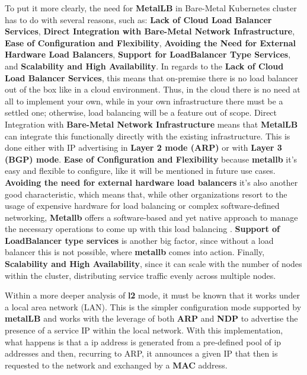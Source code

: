 To put it more clearly, the need for \textbf{MetalLB} in Bare-Metal Kubernetes cluster has to do with several reasons, such as: \textbf{Lack of Cloud Load Balancer Services}, \textbf{Direct Integration with Bare-Metal Network Infrastructure}, \textbf{Ease of Configuration and Flexibility}, \textbf{Avoiding the Need for External Hardware Load Balancers}, \textbf{Support for LoadBalancer Type Services}, and \textbf{Scalability and High Availability}. In regards to the \textbf{Lack of Cloud Load Balancer Services}, this means that on-premise there is no load balancer out of the box like in a cloud environment. Thus, in the cloud there is no need at all to implement your own, while in your own infrastructure there must be a settled one; otherwise, load balancing will be a feature out of scope. Direct Integration with \textbf{Bare-Metal Network Infrastructure} means that \textbf{MetalLB} can integrate this functionally directly with the existing infrastructure. This is done either with IP advertising in \textbf{Layer 2 mode (ARP)} or with \textbf{Layer 3 (BGP) mode}. \textbf{Ease of Configuration and Flexibility} because \textbf{metallb} it's easy and flexible to configure, like it will be mentioned in future use cases. \textbf{Avoiding the need for external hardware load balancers} it's also another good characteristic, which means that, while other organizations resort to the usage of expensive hardware for load balancing or complex software-defined networking, \textbf{Metallb} offers a software-based and yet native approach to manage the necessary operations to come up with this load balancing \cite{hardware-vs-on-premise}. \textbf{Support of LoadBalancer type services} is another big factor, since without a load balancer this is not possible, where \textbf{metallb} comes into action. Finally, \textbf{Scalability and High Availability}, since it can scale with the number of nodes within the cluster, distributing service traffic evenly across multiple nodes.

Within a more deeper analysis of \textbf{l2} mode, it must be known that it works under a local area network (LAN). This is the simpler configuration mode supported by \textbf{metalLB} and works with the leverage of both \textbf{ARP} and \textbf{NDP} to advertise the presence of a service IP within the local network. With this implementation, what happens is that a ip address is generated from a pre-defined pool of ip addresses and then, recurring to ARP, it announces a given IP that then is requested to the network and exchanged by a \textbf{MAC} address.

